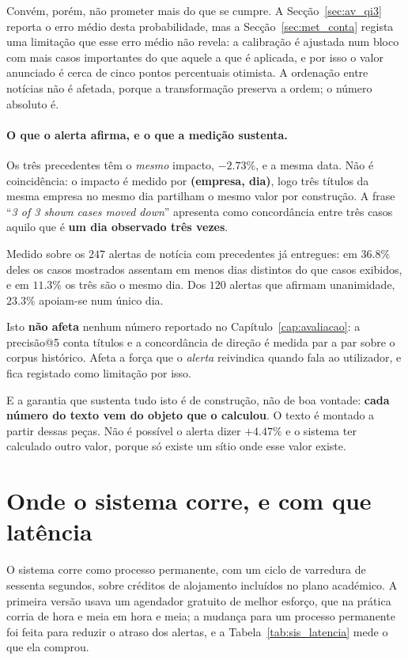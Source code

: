 Convém, porém, não prometer mais do que se cumpre. A Secção~\ref{sec:av_qi3} reporta o erro médio
desta probabilidade, mas a Secção~\ref{sec:met_conta} regista uma limitação que esse erro médio não
revela: a calibração é ajustada num bloco com mais casos importantes do que aquele a que é aplicada,
e por isso o valor anunciado é cerca de cinco pontos percentuais otimista. A ordenação entre notícias
não é afetada, porque a transformação preserva a ordem; o número absoluto é.

\paragraph{O que o alerta afirma, e o que a medição sustenta.}
Os três precedentes têm o \emph{mesmo} impacto, $-2.73\%$, e a mesma data. Não é coincidência: o
impacto é medido por \textbf{(empresa, dia)}, logo três títulos da mesma empresa no mesmo dia
partilham o mesmo valor por construção. A frase ``\emph{3 of 3 shown cases moved down}'' apresenta
como concordância entre três casos aquilo que é \textbf{um dia observado três vezes}.

Medido sobre os $247$ alertas de notícia com precedentes já entregues: em $36.8\%$ deles os casos
mostrados assentam em menos dias distintos do que casos exibidos, e em $11.3\%$ os três são o
mesmo dia. Dos $120$ alertas que afirmam unanimidade, $23.3\%$ apoiam-se num único dia.

Isto \textbf{não afeta} nenhum número reportado no Capítulo~\ref{cap:avaliacao}: a precisão@5 conta
títulos e a concordância de direção é medida par a par sobre o corpus histórico. Afeta a força que
o \emph{alerta} reivindica quando fala ao utilizador, e fica registado como limitação por isso.

E a garantia que sustenta tudo isto é de construção, não de boa vontade: \textbf{cada número do
texto vem do objeto que o calculou}. O texto é montado a partir dessas peças. Não é possível o alerta
dizer $+4.47\%$ e o sistema ter calculado outro valor, porque só existe um sítio onde esse valor
existe.

\section{Onde o sistema corre, e com que latência}
\label{sec:sis_implantacao}

O sistema corre como processo permanente, com um ciclo de varredura de sessenta segundos, sobre
créditos de alojamento incluídos no plano académico. A primeira versão usava um agendador gratuito
de melhor esforço, que na prática corria de hora e meia em hora e meia; a mudança para um processo
permanente foi feita para reduzir o atraso dos alertas, e a Tabela~\ref{tab:sis_latencia} mede o
que ela comprou.

